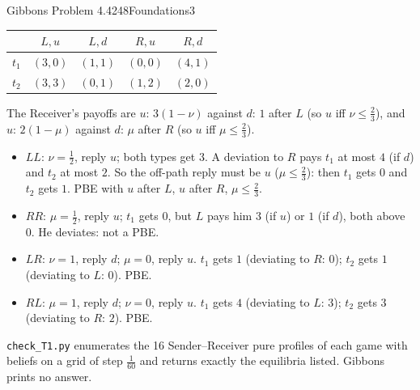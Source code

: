 \begin{exsol}{Gibbons Problem 4.4}{248}{Foundations}{3}
\begin{center}
\begin{tabular}{lcccc}
\toprule
 & $L,u$ & $L,d$ & $R,u$ & $R,d$ \\
\midrule
$t_1$ & $(3,0)$ & $(1,1)$ & $(0,0)$ & $(4,1)$ \\
$t_2$ & $(3,3)$ & $(0,1)$ & $(1,2)$ & $(2,0)$ \\
\bottomrule
\end{tabular}
\end{center}
The Receiver's payoffs are $u$: $3(1-\nu)$ against $d$: $1$ after $L$ (so $u$ iff $\nu \le \frac23$),
and $u$: $2(1-\mu)$ against $d$: $\mu$ after $R$ (so $u$ iff $\mu \le \frac23$).
\begin{itemize}
  \item $LL$: $\nu = \frac12$, reply $u$; both types get $3$. A deviation to $R$ pays $t_1$ at most $4$
  (if $d$) and $t_2$ at most $2$. So the off-path reply must be $u$ ($\mu \le \frac23$): then
  $t_1$ gets $0$ and $t_2$ gets $1$. PBE with $u$ after $L$, $u$ after $R$, $\mu \le \frac23$.
  \item $RR$: $\mu = \frac12$, reply $u$; $t_1$ gets $0$, but $L$ pays him $3$ (if $u$) or $1$
  (if $d$), both above $0$. He deviates: not a PBE.
  \item $LR$: $\nu = 1$, reply $d$; $\mu = 0$, reply $u$. $t_1$ gets $1$ (deviating to $R$: $0$);
  $t_2$ gets $1$ (deviating to $L$: $0$). PBE.
  \item $RL$: $\mu = 1$, reply $d$; $\nu = 0$, reply $u$. $t_1$ gets $4$ (deviating to $L$: $3$);
  $t_2$ gets $3$ (deviating to $R$: $2$). PBE.
\end{itemize}

\verify \texttt{check\_T1.py} enumerates the 16 Sender--Receiver pure profiles of each game with
beliefs on a grid of step $\frac1{60}$ and returns exactly the equilibria listed. Gibbons prints
no answer.

\end{exsol}
